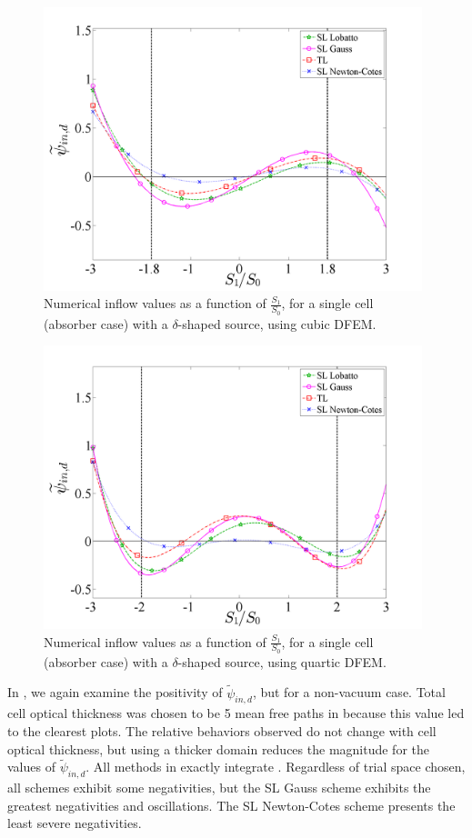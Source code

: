 \begin{figure}[!hbp]
\centering
\includegraphics[width=11cm]{chapter2_constant_xs/Final_Inflow_RHS_Comparison_Source_P3_MFP_5.png}
\caption{Numerical inflow values  as a function of $\frac{S_1}{S_0}$, for a single cell (absorber case) with a $\delta$-shaped source, using cubic DFEM.}
\label{fig:abs_inflow_p3}
\end{figure}
\begin{figure}[!htp]
\centering
\includegraphics[width=11cm]{chapter2_constant_xs/Final_Inflow_RHS_Comparison_Source_P4_MFP_5.png}
\caption{Numerical inflow values  as a function of $\frac{S_1}{S_0}$, for a single cell (absorber case) with a $\delta$-shaped source, using quartic DFEM.}
\label{fig:abs_inflow_p4}
\end{figure}
\newpage
In , we again examine the positivity of $\widetilde{\psi}_{in,d}$, but for a non-vacuum case.
Total cell optical thickness was chosen to be 5 mean free paths in  because this value led to the clearest plots.
The relative behaviors observed do not change with cell optical thickness, but using a thicker domain reduces the magnitude for the values of $\widetilde{\psi}_{in,d}$.
All methods in  exactly integrate .
Regardless of trial space chosen,  all schemes exhibit some negativities, but the SL Gauss scheme exhibits the greatest negativities and oscillations. 
The SL Newton-Cotes scheme presents the least severe negativities.


